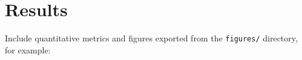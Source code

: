 \section{Results}

Include quantitative metrics and figures exported from the \texttt{figures/} directory, for example:

